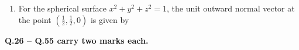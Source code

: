 \documentclass[journal,12pt,onecolumn]{IEEEtran}
\begin{document}
\begin{enumerate}
    \item For the spherical surface \(x^2 + y^2 + z^2 = 1\), the unit outward normal vector at the point \(\left(\frac{1}{2}, \frac{1}{2}, 0\right)\) is given by

          \begin{enumerate}
          \end{enumerate}

\end{enumerate}

\newpage

\large\textbf{Q.26 -- Q.55 carry two marks each.}\\
\end{document}
